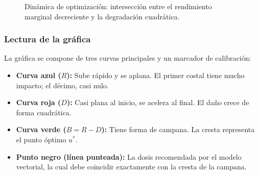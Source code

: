 \documentclass[12pt]{article}
\begin{document}
\begin{figure}[htpb]
\centering
{}
\caption{Dinámica de optimización: intersección entre el rendimiento marginal decreciente y la degradación cuadrática.}
\label{fig:optimo_fertilizacion}
\end{figure}

\subsubsection{Lectura de la gráfica}
La gráfica se compone de tres curvas principales y un marcador de calibración:

\begin{itemize}
    \item \textbf{Curva azul ($R$):} Sube rápido y se aplana. El primer costal tiene mucho impacto; el décimo, casi nulo.
    \item \textbf{Curva roja ($D$):} Casi plana al inicio, se acelera al final. El daño crece de forma cuadrática.
    \item \textbf{Curva verde ($B = R - D$):} Tiene forma de campana. La cresta representa el punto óptimo $u^*$.
    \item \textbf{Punto negro (línea punteada):} La dosis recomendada por el modelo vectorial, la cual debe coincidir exactamente con la cresta de la campana.
\end{itemize}
\end{document}
